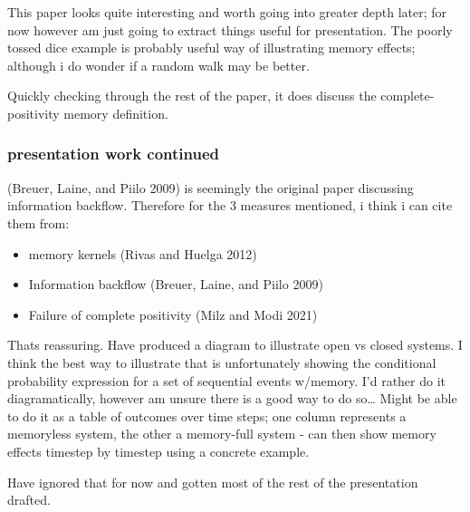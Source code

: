 \documentclass[
  letterpaper,
  DIV=11,
  numbers=noendperiod,
  oneside]{scrartcl}
\providecommand{\tightlist}{%
  \setlength{\itemsep}{0pt}\setlength{\parskip}{0pt}}
\begin{document}

This paper looks quite interesting and worth going into greater depth
later; for now however am just going to extract things useful for
presentation. The poorly tossed dice example is probably useful way of
illustrating memory effects; although i do wonder if a random walk may
be better.

Quickly checking through the rest of the paper, it does discuss the
complete-positivity memory definition.

\subsubsection{presentation work
continued}\label{presentation-work-continued}

(Breuer, Laine, and Piilo 2009) is seemingly the original paper
discussing information backflow. Therefore for the 3 measures mentioned,
i think i can cite them from:

\begin{itemize}
\tightlist
\item
  memory kernels (Rivas and Huelga 2012)
\item
  Information backflow (Breuer, Laine, and Piilo 2009)
\item
  Failure of complete positivity (Milz and Modi 2021)
\end{itemize}

Thats reassuring. Have produced a diagram to illustrate open vs closed
systems. I think the best way to illustrate that is unfortunately
showing the conditional probability expression for a set of sequential
events w/memory. I'd rather do it diagramatically, however am unsure
there is a good way to do so\ldots{} Might be able to do it as a table
of outcomes over time steps; one column represents a memoryless system,
the other a memory-full system - can then show memory effects timestep
by timestep using a concrete example.

Have ignored that for now and gotten most of the rest of the
presentation drafted.
\end{document}
